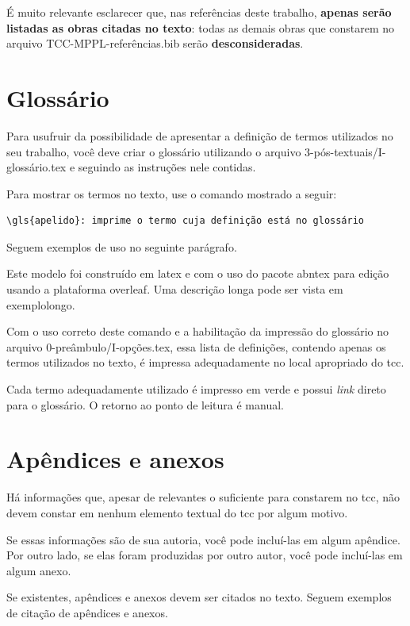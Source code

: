 É muito relevante esclarecer que, nas referências deste trabalho, \textbf{apenas serão listadas as obras citadas no texto}: todas as demais obras que constarem no arquivo \textsf{TCC-MPPL-referências.bib} serão \textbf{desconsideradas}.
 
\section{Glossário}

Para usufruir da possibilidade de apresentar a definição de termos utilizados no seu trabalho, você deve criar o glossário utilizando o arquivo \textsf{3-pós-textuais/I-glossário.tex} e seguindo as instruções nele contidas.

Para mostrar os termos no texto, use o comando mostrado a seguir:
\begin{verbatim}
\gls{apelido}: imprime o termo cuja definição está no glossário
\end{verbatim}

Seguem exemplos de uso no seguinte parágrafo.

Este modelo foi construído em \gls{latex} e com o uso do pacote \gls{abntex} para edição usando a plataforma \gls{overleaf}. Uma descrição longa pode ser vista em \gls{exemplolongo}.

Com o uso correto deste comando e a habilitação da impressão do glossário no arquivo \textsf{0-preâmbulo/I-opções.tex}, essa lista de definições, contendo apenas os termos utilizados no texto, é impressa adequadamente no local apropriado do \ac{tcc}.

Cada termo adequadamente utilizado é impresso em \textcolor{verdeCopos}{verde} e possui \textit{link} direto para o glossário. O retorno ao ponto de leitura é manual.

\section{Apêndices e anexos}\label{sec-apen-anex}

Há informações que, apesar de relevantes o suficiente para constarem no \ac{tcc}, não devem constar em nenhum elemento textual do \ac{tcc} por algum motivo.

Se essas informações são de sua autoria, você pode incluí-las em algum apêndice. Por outro lado, se elas foram produzidas por outro autor, você pode incluí-las em algum anexo.

Se existentes, apêndices e anexos devem ser citados no texto. Seguem exemplos de citação de apêndices e anexos.

